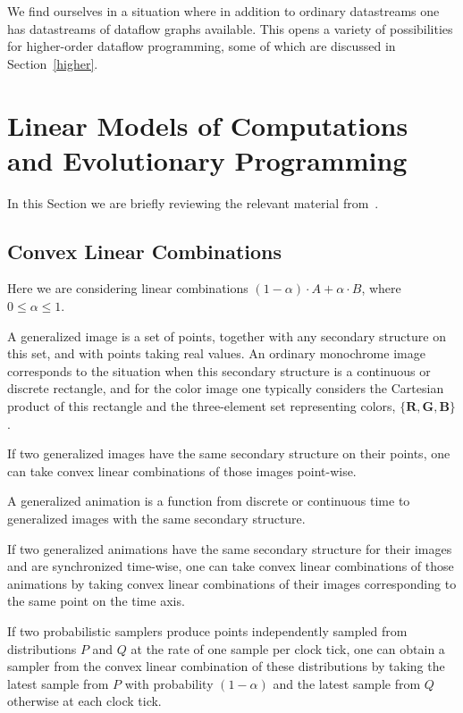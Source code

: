 \documentclass{llncs}
\begin{document}
We find ourselves in a situation where in addition to ordinary datastreams one has datastreams of dataflow graphs available.
This opens a variety of possibilities for higher-order dataflow programming, some of which are discussed in Section~\ref{higher}.


\section{Linear Models of Computations and Evolutionary Programming}\label{linear}

In this Section we are briefly reviewing the relevant material from~\cite{MBukatinMatthews}.

\subsection{Convex Linear Combinations}

Here we are considering linear combinations $(1-\alpha) \cdot A + \alpha \cdot B$, where $0 \leq \alpha \leq 1$.

A generalized image is a set of points, together with any secondary structure on this set, and with points taking
real values. An ordinary monochrome image corresponds to the situation when this secondary structure is
a continuous or discrete rectangle, and for the color image one typically considers the Cartesian product of this
rectangle and the three-element set representing colors, $\{\mathbf{R}, \mathbf{G}, \mathbf{B}\}$.

If two generalized images have the same secondary structure on their points, one can take convex linear
combinations of those images point-wise.

A generalized animation is a function from discrete or continuous time to generalized images with the same secondary structure.

If two generalized animations have the same secondary structure for their images and are synchronized time-wise,
one can take convex linear combinations of those animations by taking convex linear combinations of
their images corresponding to the same point on the time axis.

If two probabilistic samplers produce points independently sampled from distributions $P$ and $Q$ at the rate
of one sample per clock tick, one can obtain a sampler from the convex linear combination of these distributions
by taking the latest sample from $P$ with probability $(1- \alpha)$ and the latest sample from $Q$ otherwise at each clock tick.
\end{document}
